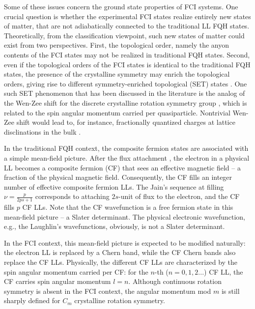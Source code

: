 Some of these issues concern the ground state properties of FCI systems. One crucial question is whether the experimental FCI states realize entirely new states of matter, that are not adiabatically connected to the traditional LL FQH states. Theoretically, from the classification viewpoint, such new states of matter could exist from two perspectives. First, the topological order, namely the anyon contents of the FCI states may not be realized in traditional FQH states. Second, even if the topological orders of the FCI states is identical to the traditional FQH states, the presence of the crystalline symmetry may enrich the topological orders, giving rise to different symmetry-enriched topological (SET) states \cite{mesaros2013classification,lu2016classification}. One such SET phenomenon that has been discussed in the literature is the analog of the Wen-Zee shift \cite{wen1992shift} for the discrete crystalline rotation symmetry group \cite{manjunath2023rotational,han2019generalized,li2020fractional,zhang2022fractional}, which is related to the spin angular momentum carried per quasiparticle. Nontrivial Wen-Zee shift would lead to, for instance, fractionally quantized charges at lattice disclinations in the bulk \cite{li2020fractional,zhang2022fractional}.

In the traditional FQH context, the composite fermion states \cite{jain1989composite} are associated with a simple mean-field picture. After the flux attachment \cite{jain1990theory}, the electron in a physical LL becomes a composite fermion (CF) that sees an effective magnetic field -- a fraction of the physical magnetic field. Consequently, the CF fills an integer number of effective composite fermion LLs. The Jain's sequence at filling $\nu=\frac{p}{2ps+1}$ corresponds to attaching $2s$-unit of flux to the electron, and the CF fills $p$ CF LLs. Note that the CF wavefunction is a free fermion state in this mean-field picture -- a Slater determinant. The physical electronic wavefunction, e.g., the Laughlin's wavefunctions, obviously, is not a Slater determinant.

In the FCI context, this mean-field picture is expected to be modified naturally: the electron LL is replaced by a Chern band, while the CF Chern bands also replace the CF LLs. Physically, the different CF LLs are characterized by the spin angular momentum carried per CF: for the $n$-th ($n=0,1,2...$) CF LL, the CF carries spin angular momentum $l=n$. Although continuous rotation symmetry is absent in the FCI context, the angular momentum mod $m$ is still sharply defined for  $C_m$ crystalline rotation symmetry.

